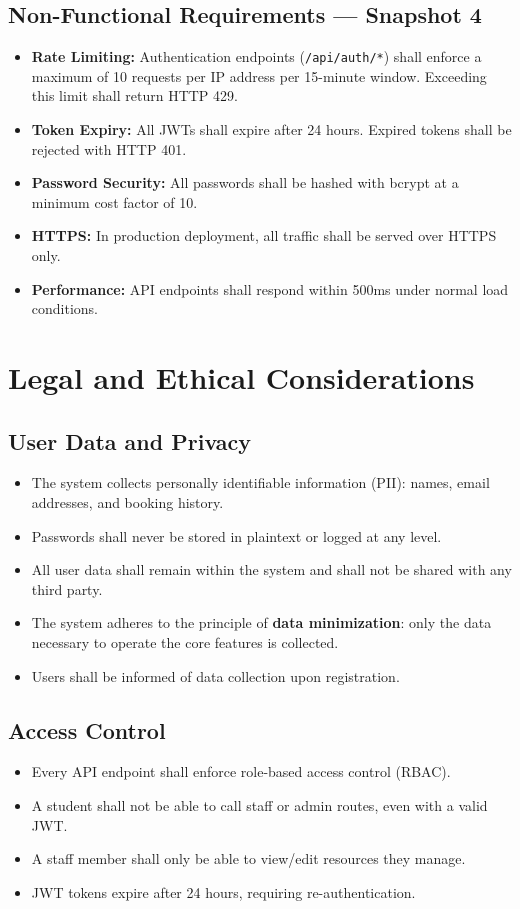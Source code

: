 \documentclass[12pt]{article}
\begin{document}
\subsection{Non-Functional Requirements --- Snapshot 4}
\begin{itemize}
    \item \textbf{Rate Limiting:} Authentication endpoints (\texttt{/api/auth/*}) shall enforce a maximum of 10 requests per IP address per 15-minute window. Exceeding this limit shall return HTTP 429.
    \item \textbf{Token Expiry:} All JWTs shall expire after 24 hours. Expired tokens shall be rejected with HTTP 401.
    \item \textbf{Password Security:} All passwords shall be hashed with bcrypt at a minimum cost factor of 10.
    \item \textbf{HTTPS:} In production deployment, all traffic shall be served over HTTPS only.
    \item \textbf{Performance:} API endpoints shall respond within 500ms under normal load conditions.
\end{itemize}

\section{Legal and Ethical Considerations}

\subsection{User Data and Privacy}
\begin{itemize}
    \item The system collects personally identifiable information (PII): names, email addresses, and booking history.
    \item Passwords shall never be stored in plaintext or logged at any level.
    \item All user data shall remain within the system and shall not be shared with any third party.
    \item The system adheres to the principle of \textbf{data minimization}: only the data necessary to operate the core features is collected.
    \item Users shall be informed of data collection upon registration.
\end{itemize}

\subsection{Access Control}
\begin{itemize}
    \item Every API endpoint shall enforce role-based access control (RBAC).
    \item A student shall not be able to call staff or admin routes, even with a valid JWT.
    \item A staff member shall only be able to view/edit resources they manage.
    \item JWT tokens expire after 24 hours, requiring re-authentication.
\end{itemize}
\end{document}
